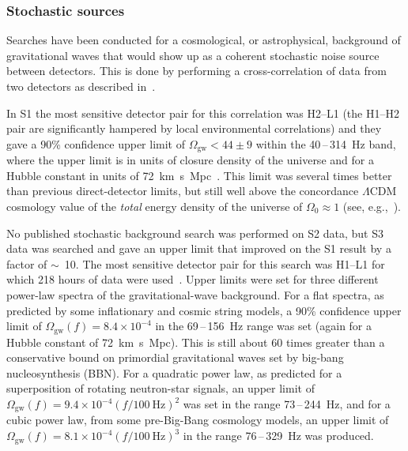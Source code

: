 \subsubsection{Stochastic sources}

Searches have been conducted for a cosmological, or astrophysical, background of gravitational waves that
would show up as a coherent stochastic noise source between detectors. This is done by performing a
cross-correlation of data from two detectors as described in~\cite{Allen:1999b}.

In S1 the most sensitive detector pair for this correlation was H2--L1 (the H1--H2
pair are significantly hampered by local environmental correlations) and they
gave a 90\% confidence upper limit of $\Omega_{\mathrm{gw}} < 44\pm9$ within the 40\,--\,314~Hz band, where the upper limit is in
units of closure density of the universe and for a Hubble constant in units of
72~km~s~Mpc~\cite{Abbott:2004e}. This limit was several times
better than previous direct-detector limits, but still well above the
concordance $\Lambda$CDM cosmology value of the \textit{total} energy density of
the universe of $\Omega_0\approx1$ (see, e.g.,~\cite{Jarosik:2010}).

No published stochastic background search was performed on S2 data, but S3 data
was searched and gave an upper limit that improved on the S1 result by a factor
of $\sim$~10. The most sensitive detector pair for this search was H1--L1 for
which 218 hours of data were used~\cite{Abbott:2005h}. Upper limits were set for
three different power-law spectra of the gravitational-wave background. For a
flat spectra, as predicted by some inflationary and cosmic string models, a 90\%
confidence upper limit of $\Omega_{\mathrm{gw}}(f) = 8.4\times10^{-4}$ in the
69\,--\,156~Hz range was set (again for a Hubble constant of
72~km~s~Mpc). This is still about 60 times greater than a
conservative bound on primordial gravitational waves set by big-bang
nucleosynthesis (BBN). For a quadratic power law, as predicted for a
superposition of rotating neutron-star signals, an upper limit of
$\Omega_{\mathrm{gw}}(f) = 9.4\times10^{-4}(f/100 \mathrm{\ Hz})^2$ was set in the range 73\,--\,244~Hz,
and for a cubic power law, from some pre-Big-Bang cosmology models, an upper
limit of $\Omega_{\mathrm{gw}}(f) = 8.1\times10^{-4}(f/100 \mathrm{\ Hz})^3$ in the range
76\,--\,329~Hz was produced.

